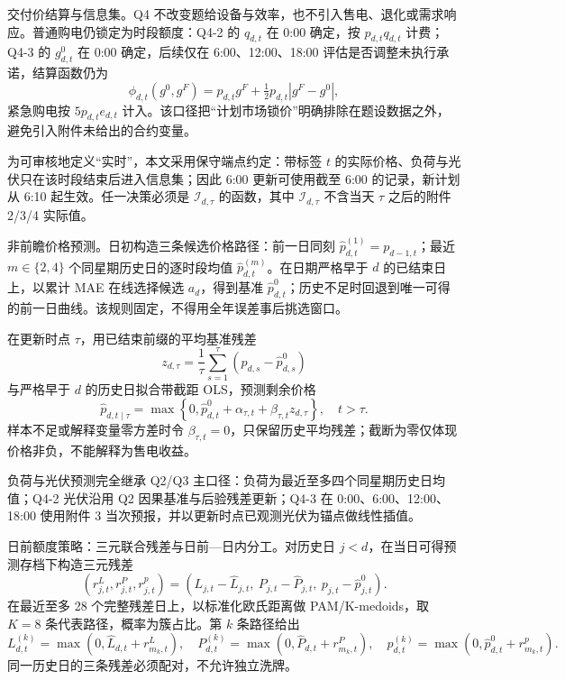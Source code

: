 \noindent 交付价结算与信息集。Q4 不改变题给设备与效率，也不引入售电、退化或需求响应。普通购电仍锁定为时段额度：Q4-2 的 $q_{d,t}$ 在 0:00 确定，按 $p_{d,t}q_{d,t}$ 计费；Q4-3 的 $g^0_{d,t}$ 在 0:00 确定，后续仅在 6:00、12:00、18:00 评估是否调整未执行承诺，结算函数仍为
\begin{equation}
\phi_{d,t}(g^0,g^F)=p_{d,t}g^F+\tfrac12 p_{d,t}|g^F-g^0|,
\label{eq:q4-settlement}
\end{equation}
紧急购电按 $5p_{d,t}e_{d,t}$ 计入。该口径把“计划市场锁价”明确排除在题设数据之外，避免引入附件未给出的合约变量。

为可审核地定义“实时”，本文采用保守端点约定：带标签 $t$ 的实际价格、负荷与光伏只在该时段结束后进入信息集；因此 6:00 更新可使用截至 6:00 的记录，新计划从 6:10 起生效。任一决策必须是 $\mathcal I_{d,\tau}$ 的函数，其中 $\mathcal I_{d,\tau}$ 不含当天 $\tau$ 之后的附件 2/3/4 实际值。

\noindent 非前瞻价格预测。日初构造三条候选价格路径：前一日同刻 $\widehat p^{(1)}_{d,t}=p_{d-1,t}$；最近 $m\in\{2,4\}$ 个同星期历史日的逐时段均值 $\widehat p^{(m)}_{d,t}$。在日期严格早于 $d$ 的已结束日上，以累计 MAE 在线选择候选 $a_d$，得到基准 $\widehat p^0_{d,t}$；历史不足时回退到唯一可得的前一日曲线。该规则固定，不得用全年误差事后挑选窗口\cite{tashman}。

在更新时点 $\tau$，用已结束前缀的平均基准残差
\begin{equation}
z_{d,\tau}=\frac1{\tau}\sum_{s=1}^{\tau}\left(p_{d,s}-\widehat p^0_{d,s}\right)
\label{eq:q4-price-prefix}
\end{equation}
与严格早于 $d$ 的历史日拟合带截距 OLS，预测剩余价格
\begin{equation}
\widehat p_{d,t\mid\tau}
=\max\left\{0,\widehat p^0_{d,t}+\alpha_{\tau,t}+\beta_{\tau,t}z_{d,\tau}\right\},\quad t>\tau.
\label{eq:q4-price-ols}
\end{equation}
样本不足或解释变量零方差时令 $\beta_{\tau,t}=0$，只保留历史平均残差；截断为零仅体现价格非负，不能解释为售电收益。

负荷与光伏预测完全继承 Q2/Q3 主口径：负荷为最近至多四个同星期历史日均值；Q4-2 光伏沿用 Q2 因果基准与后验残差更新；Q4-3 在 0:00、6:00、12:00、18:00 使用附件 3 当次预报，并以更新时点已观测光伏为锚点做线性插值。

\noindent 日前额度策略：三元联合残差与日前—日内分工。对历史日 $j<d$，在当日可得预测存档下构造三元残差
\begin{equation}
\left(r^L_{j,t},r^P_{j,t},r^p_{j,t}\right)
=\left(L_{j,t}-\widehat L_{j,t},\ P_{j,t}-\widehat P_{j,t},\ p_{j,t}-\widehat p^0_{j,t}\right).
\label{eq:q4-triple-residual}
\end{equation}
在最近至多 28 个完整残差日上，以标准化欧氏距离做 PAM/K-medoids，取 $K=8$ 条代表路径，概率为簇占比。第 $k$ 条路径给出
\begin{equation}
L^{(k)}_{d,t}=\max(0,\widehat L_{d,t}+r^L_{m_k,t}),\quad
P^{(k)}_{d,t}=\max(0,\widehat P_{d,t}+r^P_{m_k,t}),\quad
p^{(k)}_{d,t}=\max(0,\widehat p^0_{d,t}+r^p_{m_k,t}).
\label{eq:q4-scenario-path}
\end{equation}
同一历史日的三条残差必须配对，不允许独立洗牌\cite{durante}。

